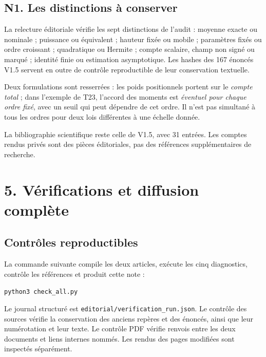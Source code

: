 \documentclass[11pt,a4paper]{article}
\begin{document}
\subsection*{N1. Les distinctions à conserver}
La relecture éditoriale vérifie les sept distinctions de l'audit :
moyenne exacte ou nominale ; puissance ou équivalent ; hauteur fixée
ou mobile ; paramètres fixés ou ordre croissant ; quadratique ou
Hermite ; compte scalaire, champ non signé ou marqué ; identité finie
ou estimation asymptotique. Les hashes des 167 énoncés V1.5 servent
en outre de contrôle reproductible de leur conservation textuelle.

Deux formulations sont resserrées : les poids positionnels portent
sur le \emph{compte total} ; dans l'exemple de T23, l'accord des
moments est \emph{éventuel pour chaque ordre fixé}, avec un seuil
qui peut dépendre de cet ordre. Il n'est pas simultané à tous les
ordres pour deux lois différentes à une échelle donnée.

La bibliographie scientifique reste celle de V1.5, avec 31 entrées.
Les comptes rendus privés sont des pièces éditoriales, pas des
références supplémentaires de recherche.

\clearpage
\section*{5. Vérifications et diffusion complète}
\subsection*{Contrôles reproductibles}
La commande suivante compile les deux articles, exécute les cinq
diagnostics, contrôle les références et produit cette note :
\begin{center}\texttt{python3 check\_all.py}\end{center}
Le journal structuré est \texttt{editorial/verification\_run.json}.
Le contrôle des sources vérifie la conservation des
\PreservedLabelCount{} anciens repères et des
\NumberedResultCount{} énoncés, ainsi que leur numérotation et leur texte.
Le contrôle PDF vérifie \CrossDocumentLinkCount{} renvois entre les
deux documents et \InternalLinkCount{} liens internes nommés.
Les rendus des pages modifiées sont inspectés séparément.
\end{document}
